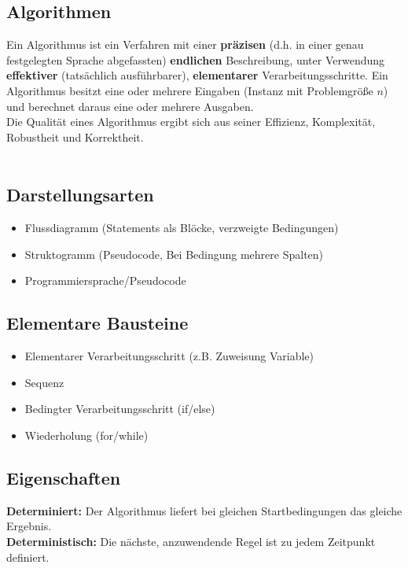 \documentclass[fs, footer]{latex4ei}
\begin{document}
\begin{multicols*}{4}
\section{Algorithmen}
Ein Algorithmus ist ein Verfahren mit einer \textbf{präzisen} (d.h. in einer genau festgelegten Sprache
abgefassten) \textbf{endlichen} Beschreibung, unter Verwendung \textbf{effektiver} (tatsächlich ausführbarer), \textbf{elementarer} Verarbeitungsschritte.
Ein Algorithmus besitzt eine oder mehrere Eingaben (Instanz mit Problemgröße $n$) und berechnet daraus eine oder mehrere Ausgaben.\\
Die Qualität eines Algorithmus ergibt sich aus seiner Effizienz, Komplexität, Robustheit und Korrektheit.\\
\\
\subsection{Darstellungsarten}
\begin{itemize}
\item Flussdiagramm (Statements als Blöcke, verzweigte Bedingungen)
\item Struktogramm (Pseudocode, Bei Bedingung mehrere Spalten)
\item Programmiersprache/Pseudocode
\end{itemize}
\subsection{Elementare Bausteine}
\begin{itemize}
\item Elementarer Verarbeitungsschritt (z.B. Zuweisung Variable)
\item Sequenz
\item Bedingter Verarbeitungsschritt (if/else)
\item Wiederholung (for/while)
\end{itemize}
\subsection{Eigenschaften}
\textbf{Determiniert:} Der Algorithmus liefert bei gleichen Startbedingungen das gleiche Ergebnis.\\
\textbf{Deterministisch:} Die nächste, anzuwendende Regel ist zu jedem Zeitpunkt definiert.\\

\end{multicols*}
\end{document}
